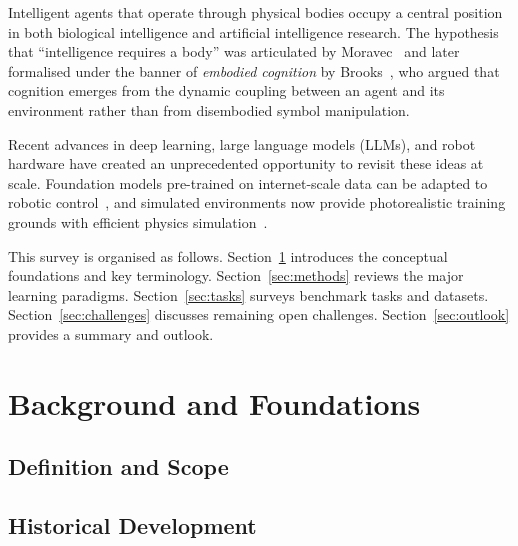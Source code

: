 \documentclass[12pt, a4paper]{article}
\begin{document}
Intelligent agents that operate through physical bodies occupy
a central position in both biological intelligence and
artificial intelligence research.
The hypothesis that ``intelligence requires a body'' was
articulated by Moravec~\cite{moravec1988mind} and later
formalised under the banner of \emph{embodied cognition}
by Brooks~\cite{brooks1991intelligence}, who argued that
cognition emerges from the dynamic coupling between an
agent and its environment rather than from disembodied
symbol manipulation.

Recent advances in deep learning, large language models (LLMs),
and robot hardware have created an unprecedented opportunity to
revisit these ideas at scale.
Foundation models pre-trained on internet-scale data can be
adapted to robotic control~\cite{brohan2022rt1, driess2023palme},
and simulated environments now provide photorealistic training
grounds with efficient physics simulation~\cite{kolve2017ai2thor,
savva2019habitat}.

This survey is organised as follows.
Section~\ref{sec:background} introduces the conceptual
foundations and key terminology.
Section~\ref{sec:methods} reviews the major learning paradigms.
Section~\ref{sec:tasks} surveys benchmark tasks and datasets.
Section~\ref{sec:challenges} discusses remaining open challenges.
Section~\ref{sec:outlook} provides a summary and outlook.

\section{Background and Foundations}
\label{sec:background}

\subsection{Definition and Scope}

\subsection{Historical Development}
\end{document}
